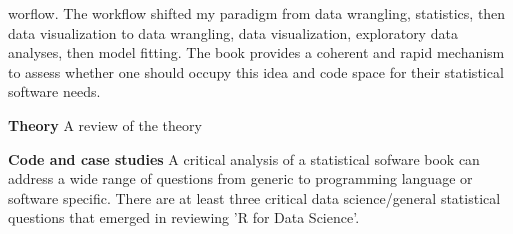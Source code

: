 \documentclass[bookreview]{jss}
\begin{document}
worflow. The workflow shifted my paradigm from data wrangling, statistics, then data visualization to data wrangling, data visualization, exploratory data analyses, then model fitting. The book provides a coherent and rapid mechanism to assess whether one should occupy this idea and code space for their statistical software needs. \newline

\textbf{Theory} \newline
A review of the theory
 \newline

\textbf{Code and case studies} \newline
A critical analysis of a statistical sofware book can address a wide range of questions from generic to programming language or software specific. There are at least three critical data science/general statistical questions that emerged in reviewing 'R for Data Science'. \newline 
\end{document}
